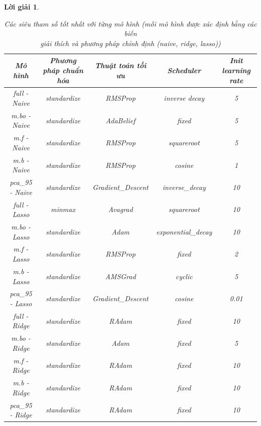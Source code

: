 \documentclass[14pt, a4paper]{article}
\theoremstyle{sltheorem}
\theoremstyle{soltheorem}
\newtheorem*{loigiai}{Lời giải}
\begin{document}
\begin{loigiai}
    \begin{table}[h!]
        \centering
        \begin{tabular}{|c | c | c | c | c |}
            \hline
            Mô hình & Phương pháp chuẩn hóa & Thuật toán tối ưu & Scheduler & Init learning rate \\
            \hline
            \hline
            full - Naive & standardize & RMSProp & inverse decay & 5 \\
            \hline
            m.bo - Naive & standardize & AdaBelief & fixed & 5 \\
            \hline
            m.f - Naive & standardize & RMSProp & squareroot &5 \\
            \hline
            m.b - Naive & standardize & RMSProp & cosine & 1 \\
            \hline
            pca\_95 - Naive & standardize & Gradient\_Descent & inverse\_decay & 10 \\
            \hline
            full - Lasso & minmax & Avagrad & squareroot & 10 \\
            \hline
            m.bo - Lasso & standardize & Adam & exponential\_decay & 10 \\
            \hline
            m.f - Lasso & standardize & RMSProp & fixed &2 \\
            \hline
            m.b - Lasso & standardize & AMSGrad & cyclic & 5 \\
            \hline
            pca\_95 - Lasso & standardize & Gradient\_Descent & cosine & 0.01 \\
            \hline
            full - Ridge & standardize & RAdam & fixed & 10 \\
            \hline
            m.bo - Ridge & standardize & Adam & fixed & 5 \\
            \hline
            m.f - Ridge & standardize & RAdam & fixed & 10 \\
            \hline
            m.b - Ridge & standardize & RAdam & fixed & 10 \\
            \hline
            pca\_95 - Ridge & standardize & RAdam & fixed & 10 \\
            \hline
        \end{tabular}
        \caption{Các siêu tham số tốt nhất với từng mô hình (mỗi mô hình được xác định bằng các biến \\ giải thích và phương pháp chỉnh định (naive, ridge, lasso))}
        \label{tab:custom-hyperparameter-result}
    \end{table}



\end{loigiai}
\end{document}
